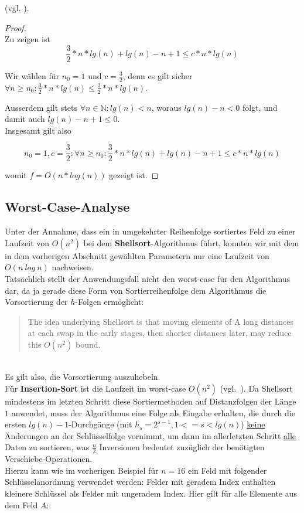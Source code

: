 (vgl. \cite[11]{GD18a}).
\begin{proof}\label{pr:nlogn}
    \\
Zu zeigen ist
\begin{equation}
\frac{3}{2} * n * lg(n) + lg(n) - n + 1 \leq c * n * lg(n)
\end{equation}

Wir wählen für $n_0 = 1$  und $c = \frac{3}{2}$, denn es gilt sicher $\forall n \geq n_0: \frac{3}{2} * n * lg(n)  \leq \frac{3}{2} * n * lg(n)$.

Ausserdem gilt stets $\forall n \in \mathbb{N}: lg(n) < n$, woraus $lg(n) - n < 0$ folgt, und damit auch $lg(n) - n + 1 \leq 0$.
\\
Insgesamt gilt also

\begin{equation}
n_0 = 1, c = \frac{3}{2}: \forall n \geq n_0: \frac{3}{2} * n * lg(n) + lg(n) - n + 1 \leq c * n * lg(n)
\end{equation}

    womit $f = O(n * log(n))$ gezeigt ist.\blacksquare
\end{proof}

\subsection*{Worst-Case-Analyse}

Unter der Annahme, dass ein in umgekehrter Reihenfolge sortiertes Feld zu einer Laufzeit von $O(n^2)$ bei dem \textbf{Shellsort}-Algorithmus führt, konnten wir mit dem in dem vorherigen Abschnitt gewählten Parametern nur eine Laufzeit von $O(n\ log\ n)$ nachweisen.
\\

Tatsächlich stellt der Anwendungsfall nicht den worst-case für den Algorithmus dar, da ja gerade diese Form von Sortierreihenfolge dem Algorithmus die Vorsortierung der $h$-Folgen ermöglicht:
\\
\blockquote[{\cite[3]{Pra72}}]{
    The idea underlying Shellsort is that moving elements of A long
    distances at each swap in the early stages, then shorter distances later,
    may reduce this $O(n^2)$ bound.
}
\\

Es gilt also, die Vorsortierung auszuhebeln.
\\

Für \textbf{Insertion-Sort} ist die Laufzeit im worst-case $O(n^2)$ (vgl.~\cite[87]{OW17b}). Da Shellsort mindestens im letzten Schritt diese Sortiermethoden auf Distanzfolgen der Länge $1$ anwendet, muss der Algorithmus eine Folge als Eingabe erhalten, die durch die ersten $lg(n) - 1$-Durchgänge (mit $h_s = 2^{s - 1}, 1 <= s < lg(n)$) \underline{keine} Änderungen an der Schlüsselfolge vornimmt, um dann im allerletzten Schritt \underline{alle} Daten zu sortieren, was $\frac{n}{2}$ Inversionen bedeutet zuzüglich der benötigten Verschiebe-Operationen.
\\
Hierzu kann wie im vorherigen Beispiel für $n=16$ ein Feld mit folgender Schlüsselanordnung verwendet werden: Felder mit geradem Index enthalten kleinere Schlüssel als Felder mit ungeradem Index.
Hier gilt für alle Elemente aus dem Feld $A$:

